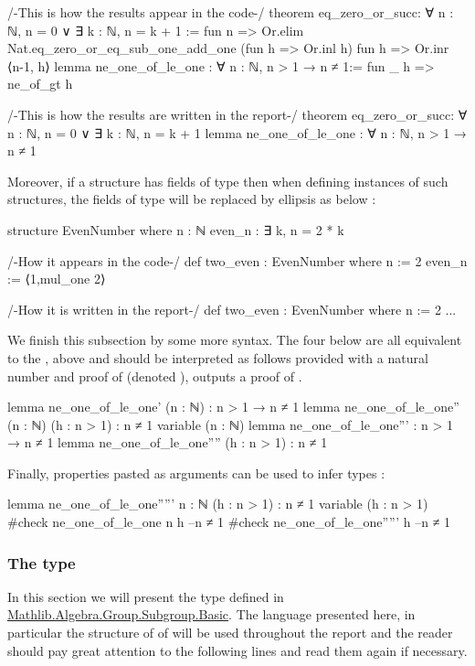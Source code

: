 \begin{leancode}
/-This is how the results appear in the code-/
theorem eq_zero_or_succ: ∀ n : ℕ, n = 0 ∨ ∃ k : ℕ, n = k + 1 := 
  fun n => Or.elim Nat.eq_zero_or_eq_sub_one_add_one  
    (fun h => Or.inl h) fun h => Or.inr ⟨n-1, h⟩
lemma ne_one_of_le_one : ∀ n : ℕ, n > 1 → n ≠ 1:= fun _ h => ne_of_gt h

/-This is how the results are written in the report-/
theorem eq_zero_or_succ: ∀ n : ℕ, n = 0 ∨ ∃ k : ℕ, n = k + 1
lemma ne_one_of_le_one : ∀ n : ℕ, n > 1 → n ≠ 1
\end{leancode}

Moreover, if a structure has fields of type  then when defining instances of such structures, the fields of type  will be replaced by ellipsis as below :
\begin{leancode}
structure EvenNumber where 
  n : ℕ
  even_n : ∃ k, n = 2 * k

/-How it appears in the code-/
def two_even : EvenNumber where
 n := 2
 even_n := ⟨1,mul_one 2⟩

/-How it is written in the report-/
def two_even : EvenNumber where
  n := 2
  ...
\end{leancode}

We finish this subsection by some more syntax. The four  below are all equivalent to the ,  above and should be interpreted as follows provided with a natural number  and proof  of  (denoted ),  outputs a proof of .
\begin{leancode}
lemma ne_one_of_le_one' (n : ℕ) : n > 1 → n ≠ 1
lemma ne_one_of_le_one'' (n : ℕ) (h : n > 1) : n ≠ 1
variable (n : ℕ)
lemma ne_one_of_le_one''' :  n > 1 → n ≠ 1
lemma ne_one_of_le_one''''  (h : n > 1) : n ≠ 1
\end{leancode}

Finally, properties pasted as arguments can be used to infer types :
\begin{leancode}
lemma ne_one_of_le_one''''' {n : ℕ} (h : n > 1) : n ≠ 1
variable (h : n > 1)
#check ne_one_of_le_one n h --n ≠ 1
#check ne_one_of_le_one''''' h --n ≠ 1
\end{leancode}

\subsubsection{The  type}
\label{subsub:subgroup}
In this section we will present the type  defined in \href{https://github.com/leanprover-community/mathlib4/blob/318082b0bccc3abd9d654496f7b60267f277d5fd/Mathlib/Algebra/Group/Subgroup/Basic.lean}{Mathlib.Algebra.Group.Subgroup.Basic}.
The language presented here, in particular the structure of  of  will be used throughout the report and the reader should pay great attention to the following lines and read them again if necessary.

